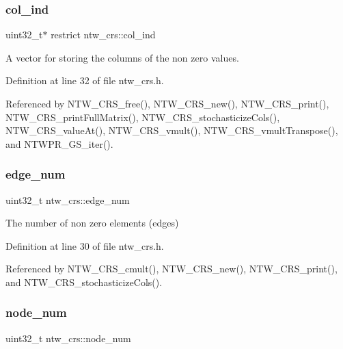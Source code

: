 \subsubsection{\texorpdfstring{col\+\_\+ind}{col\_ind}}
{\footnotesize\ttfamily uint32\+\_\+t$\ast$ restrict ntw\+\_\+crs\+::col\+\_\+ind}

A vector for storing the columns of the non zero values. 

Definition at line 32 of file ntw\+\_\+crs.\+h.



Referenced by N\+T\+W\+\_\+\+C\+R\+S\+\_\+free(), N\+T\+W\+\_\+\+C\+R\+S\+\_\+new(), N\+T\+W\+\_\+\+C\+R\+S\+\_\+print(), N\+T\+W\+\_\+\+C\+R\+S\+\_\+print\+Full\+Matrix(), N\+T\+W\+\_\+\+C\+R\+S\+\_\+stochasticize\+Cols(), N\+T\+W\+\_\+\+C\+R\+S\+\_\+value\+At(), N\+T\+W\+\_\+\+C\+R\+S\+\_\+vmult(), N\+T\+W\+\_\+\+C\+R\+S\+\_\+vmult\+Transpose(), and N\+T\+W\+P\+R\+\_\+\+G\+S\+\_\+iter().

\mbox{\label{structntw__crs_a85160ebade6d93ba77c9e90f2f237cea}} 
\subsubsection{\texorpdfstring{edge\+\_\+num}{edge\_num}}
{\footnotesize\ttfamily uint32\+\_\+t ntw\+\_\+crs\+::edge\+\_\+num}

The number of non zero elements (edges) 

Definition at line 30 of file ntw\+\_\+crs.\+h.



Referenced by N\+T\+W\+\_\+\+C\+R\+S\+\_\+cmult(), N\+T\+W\+\_\+\+C\+R\+S\+\_\+new(), N\+T\+W\+\_\+\+C\+R\+S\+\_\+print(), and N\+T\+W\+\_\+\+C\+R\+S\+\_\+stochasticize\+Cols().

\mbox{\label{structntw__crs_a36a11fbae59bf6159e40cb18e5f37ada}} 
\subsubsection{\texorpdfstring{node\+\_\+num}{node\_num}}
{\footnotesize\ttfamily uint32\+\_\+t ntw\+\_\+crs\+::node\+\_\+num}

